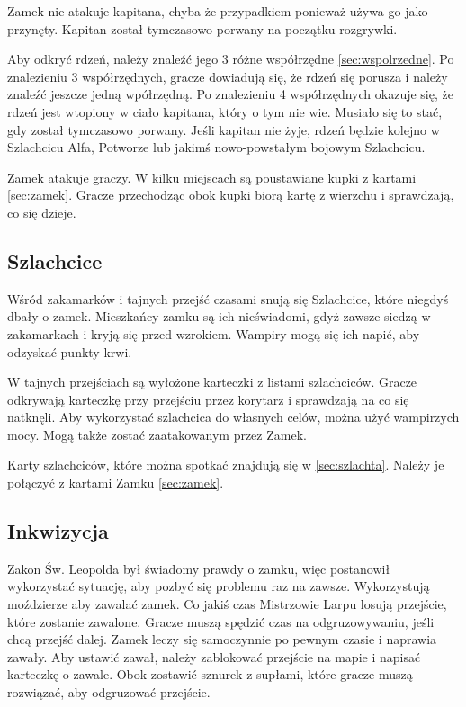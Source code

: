 		Zamek nie atakuje kapitana, chyba że przypadkiem ponieważ używa go jako przynęty.
		Kapitan został tymczasowo porwany na początku rozgrywki.
		
		Aby odkryć rdzeń, należy znaleźć jego 3 różne współrzędne \ref{sec:wspolrzedne}.
		Po znalezieniu 3 współrzędnych, gracze dowiadują się, że rdzeń się porusza i należy znaleźć jeszcze jedną wpółrzędną.
		Po znalezieniu 4 współrzędnych okazuje się, że rdzeń jest wtopiony w ciało kapitana, który o tym nie wie.
		Musiało się to stać, gdy został tymczasowo porwany.
		Jeśli kapitan nie żyje, rdzeń będzie kolejno w Szlachcicu Alfa, Potworze lub jakimś nowo-powstałym bojowym Szlachcicu.
		
		Zamek atakuje graczy.
		W kilku miejscach są poustawiane kupki z kartami \ref{sec:zamek}.
		Gracze przechodząc obok kupki biorą kartę z wierzchu i sprawdzają, co się dzieje.

	\subsection{Szlachcice}
		Wśród zakamarków i tajnych przejść czasami snują się Szlachcice, które niegdyś dbały o zamek.
		Mieszkańcy zamku są ich nieświadomi, gdyż zawsze siedzą w zakamarkach i kryją się przed wzrokiem.
		Wampiry mogą się ich napić, aby odzyskać punkty krwi.
		
		W tajnych przejściach są wyłożone karteczki z listami szlachciców.
		Gracze odkrywają karteczkę przy przejściu przez korytarz i sprawdzają na co się natknęli.
		Aby wykorzystać szlachcica do własnych celów, można użyć wampirzych mocy.
		Mogą także zostać zaatakowanym przez Zamek.
		
		Karty szlachciców, które można spotkać znajdują się w \ref{sec:szlachta}.
		Należy je połączyć z kartami Zamku \ref{sec:zamek}.
		
	\subsection{Inkwizycja}
		Zakon Św. Leopolda był świadomy prawdy o zamku, więc postanowił wykorzystać sytuację, aby pozbyć się problemu raz na zawsze.
		Wykorzystują moździerze aby zawalać zamek.
		Co jakiś czas Mistrzowie Larpu losują przejście, które zostanie zawalone.
		Gracze muszą spędzić czas na odgruzowywaniu, jeśli chcą przejść dalej.
		Zamek leczy się samoczynnie po pewnym czasie i naprawia zawały.
		Aby ustawić zawał, należy zablokować przejście na mapie i napisać karteczkę o zawale.
		Obok zostawić sznurek z supłami, które gracze muszą rozwiązać, aby odgruzować przejście.

